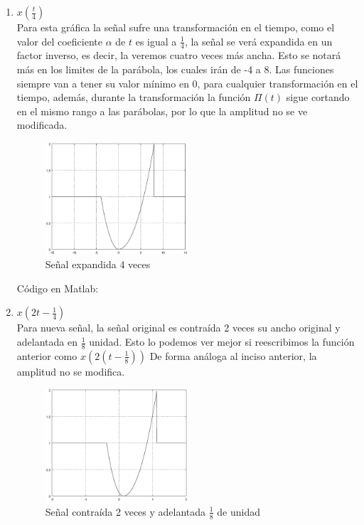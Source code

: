 \documentclass[10pt,a4paper]{report}
\begin{document}
\begin{enumerate}
  \item $x\left(\frac{t}{4}\right)$\\
  \newline Para esta gráfica la señal sufre una transformación en el tiempo, como el valor del coeficiente $\alpha$ de $t$ es igual a $\frac{1}{4}$, la señal se verá expandida en un factor inverso, es decir, la veremos cuatro veces más ancha. Esto se notará más en los limites de la parábola, los cuales irán de -4 a 8. Las funciones siempre van a tener su valor mínimo en 0, para cualquier transformación en el tiempo, además, durante la transformación la función $\Pi(t)$ sigue cortando en el mismo rango a las parábolas, por lo que la amplitud no se ve modificada.

    \begin{figure}[H]
      \begin{center}
        \includegraphics[width=0.5\textwidth]{./Ejercicio2/IncisoA}
        \caption{Señal expandida 4 veces}
        \label{fig:IncisoA}
      \end{center}
    \end{figure}
    
Código en Matlab:
    

  \item $x\left(2t-\frac{1}{4}\right)$\\
    \newline Para nueva señal, la señal original es contraída 2 veces su ancho original y adelantada en $\frac{1}{8}$ unidad. Esto lo podemos ver mejor si reescribimos la función anterior como $x\left(2\left(t-\frac{1}{8}\right)\right)$ De forma análoga al inciso anterior, la amplitud no se modifica.

    \begin{figure}[H]
      \begin{center}
        \includegraphics[width=0.5\textwidth]{./Ejercicio2/IncisoB}
        \caption{Señal contraída 2 veces y adelantada $\frac{1}{8}$ de unidad}
        \label{fig:IncisoB}
      \end{center}
    \end{figure}
    

\end{enumerate}
\end{document}
